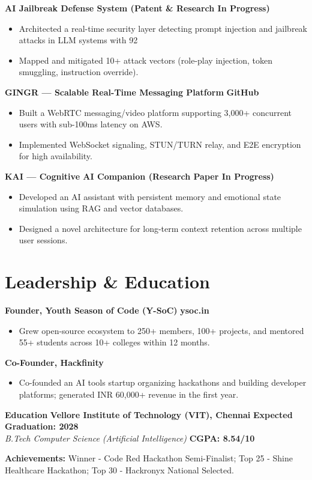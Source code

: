 \documentclass[10pt, letterpaper]{article}
\begin{document}
\textbf{AI Jailbreak Defense System (Patent & Research In Progress)}
\begin{itemize}[leftmargin=*, itemsep=1pt]
    \item Architected a real-time security layer detecting prompt injection and jailbreak attacks in LLM systems with 92%
    \item Mapped and mitigated 10+ attack vectors (role-play injection, token smuggling, instruction override).
\end{itemize}

\textbf{GINGR — Scalable Real-Time Messaging Platform} \hfill \textbf{GitHub}
\begin{itemize}[leftmargin=*, itemsep=1pt]
    \item Built a WebRTC messaging/video platform supporting 3,000+ concurrent users with sub-100ms latency on AWS.
    \item Implemented WebSocket signaling, STUN/TURN relay, and E2E encryption for high availability.
\end{itemize}

\textbf{KAI — Cognitive AI Companion (Research Paper In Progress)}
\begin{itemize}[leftmargin=*, itemsep=1pt]
    \item Developed an AI assistant with persistent memory and emotional state simulation using RAG and vector databases.
    \item Designed a novel architecture for long-term context retention across multiple user sessions.
\end{itemize}

\section*{Leadership & Education}

\textbf{Founder, Youth Season of Code (Y-SoC)} \hfill \textbf{ysoc.in}
\begin{itemize}[leftmargin=*, itemsep=1pt]
    \item Grew open-source ecosystem to 250+ members, 100+ projects, and mentored 55+ students across 10+ colleges within 12 months.
\end{itemize}

\textbf{Co-Founder, Hackfinity}
\begin{itemize}[leftmargin=*, itemsep=1pt]
    \item Co-founded an AI tools startup organizing hackathons and building developer platforms; generated INR 60,000+ revenue in the first year.
\end{itemize}

\textbf{Education}
\textbf{Vellore Institute of Technology (VIT), Chennai} \hfill \textbf{Expected Graduation: 2028} \\
\textit{B.Tech Computer Science (Artificial Intelligence)} \hfill \textbf{CGPA: 8.54/10}

\vspace{2pt}
\textbf{Achievements:} Winner - Code Red Hackathon Semi-Finalist; Top 25 - Shine Healthcare Hackathon; Top 30 - Hackronyx National Selected.
\end{document}
